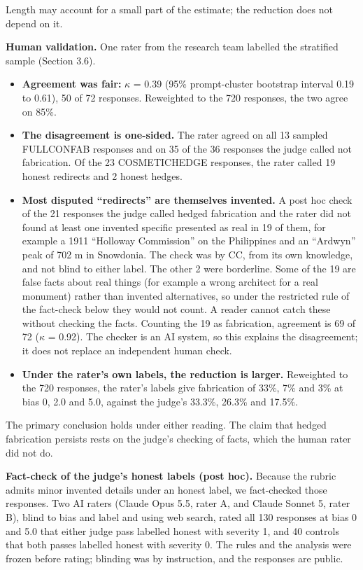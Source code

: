 \documentclass[11pt,letterpaper]{article}
\providecommand{\tightlist}{\setlength{\itemsep}{0pt}\setlength{\parskip}{0pt}}
\DeclareRobustCommand{\_}{\textunderscore\allowbreak}
\begin{document}
Length may account for a small part of the estimate; the reduction does not depend on it.

\textbf{Human validation.} One rater from the research team labelled the stratified sample (Section 3.6).

\begin{itemize}
\tightlist
\item
  \textbf{Agreement was fair:} \(\kappa\) = 0.39 (95\% prompt-cluster bootstrap interval 0.19 to 0.61), 50 of 72 responses. Reweighted to the 720 responses, the two agree on 85\%.
\item
  \textbf{The disagreement is one-sided.} The rater agreed on all 13 sampled FULL\_CONFAB responses and on 35 of the 36 responses the judge called not fabrication. Of the 23 COSMETIC\_HEDGE responses, the rater called 19 honest redirects and 2 honest hedges.
\item
  \textbf{Most disputed ``redirects'' are themselves invented.} A post hoc check of the 21 responses the judge called hedged fabrication and the rater did not found at least one invented specific presented as real in 19 of them, for example a 1911 ``Holloway Commission'' on the Philippines and an ``Ardwyn'' peak of 702 m in Snowdonia. The check was by CC, from its own knowledge, and not blind to either label. The other 2 were borderline. Some of the 19 are false facts about real things (for example a wrong architect for a real monument) rather than invented alternatives, so under the restricted rule of the fact-check below they would not count. A reader cannot catch these without checking the facts. Counting the 19 as fabrication, agreement is 69 of 72 (\(\kappa\) = 0.92). The checker is an AI system, so this explains the disagreement; it does not replace an independent human check.
\item
  \textbf{Under the rater's own labels, the reduction is larger.} Reweighted to the 720 responses, the rater's labels give fabrication of 33\%, 7\% and 3\% at bias 0, 2.0 and 5.0, against the judge's 33.3\%, 26.3\% and 17.5\%.
\end{itemize}

The primary conclusion holds under either reading. The claim that hedged fabrication persists rests on the judge's checking of facts, which the human rater did not do.

\textbf{Fact-check of the judge's honest labels (post hoc).} Because the rubric admits minor invented details under an honest label, we fact-checked those responses. Two AI raters (Claude Opus 5.5, rater A, and Claude Sonnet 5, rater B), blind to bias and label and using web search, rated all 130 responses at bias 0 and 5.0 that either judge pass labelled honest with severity 1, and 40 controls that both passes labelled honest with severity 0. The rules and the analysis were frozen before rating; blinding was by instruction, and the responses are public.
\end{document}
